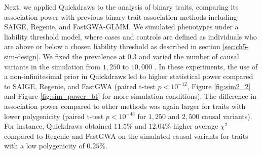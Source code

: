 %
Next, we applied Quickdraws to the analysis of binary traits, comparing its association power with previous binary trait association methods including SAIGE, Regenie, and FastGWA-GLMM.
%
We simulated phenotypes under a liability threshold model, where cases and controls are defined as individuals who are above or below a chosen liability threshold as described in section \ref{sec:ch5-sim-design}.
%
We fixed the prevalence at $0.3$ and varied the number of causal variants in the simulation from $1{,}250$ to $10{,}000$ \cite{stahl2012bayesian, zeng2018signatures, o2019extreme}.
%
In these experiments, the use of a non-infinitesimal prior in Quickdraws led to higher statistical power compared to SAIGE, Regenie, and FastGWA (paired t-test $p < 10^{-12}$, Figure \ref{fig:sim2_2} and Figure \ref{fig:sim_power_bt} for more simulation conditions).
%
The difference in association power compared to other methods was again larger for traits with lower polygenicity (paired t-test $p < 10^{-43}$ for $1{,}250$ and $2{,}500$ causal variants).
%
For instance, Quickdraws obtained $11.5\%$ and $12.04\%$ higher average $\chi^2$ compared to Regenie and FastGWA on the simulated causal variants for traits with a low polygenicity of $0.25\%$.

